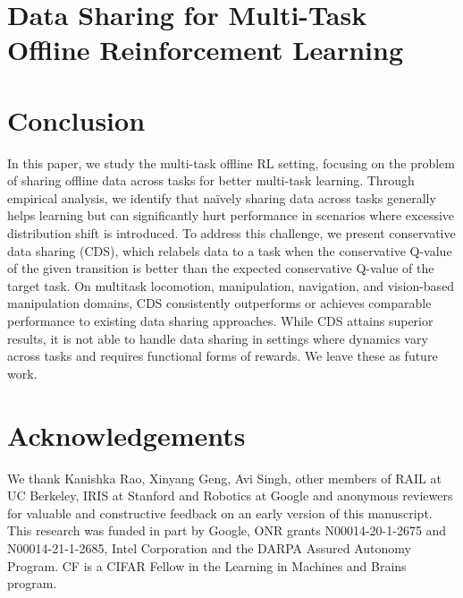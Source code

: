 \documentclass[../thesis.tex]{subfiles}
\begin{document}
\section*{Data Sharing for Multi-Task Offline Reinforcement Learning}    










    
\section{Conclusion}
\label{sec:conclusion}
In this paper, we study the multi-task offline RL setting, focusing on the problem of sharing offline data across tasks for better multi-task learning. Through empirical analysis, we identify that na\"{i}vely sharing data across tasks generally helps learning but can significantly hurt performance in scenarios where excessive distribution shift is introduced. To address this challenge, we present conservative data sharing (CDS), which relabels data to a task when the conservative Q-value of the given transition is better than the expected conservative Q-value of the target task. On multitask locomotion, manipulation, navigation, and vision-based manipulation domains, CDS consistently outperforms or achieves comparable performance to existing data sharing approaches. While CDS attains superior results, it is not able to handle data sharing in settings where dynamics vary across tasks and requires functional forms of rewards. We leave these as future work. 
    
\section*{Acknowledgements}
We thank Kanishka Rao, Xinyang Geng, Avi Singh, other members of RAIL at UC Berkeley, IRIS at Stanford and Robotics at Google and anonymous reviewers for valuable and constructive feedback on an early version of this manuscript. This research was funded in part by Google, ONR grants N00014-20-1-2675 and N00014-21-1-2685, Intel Corporation and the DARPA Assured Autonomy Program. CF is a CIFAR Fellow in the Learning in Machines and Brains program. 
\end{document}
